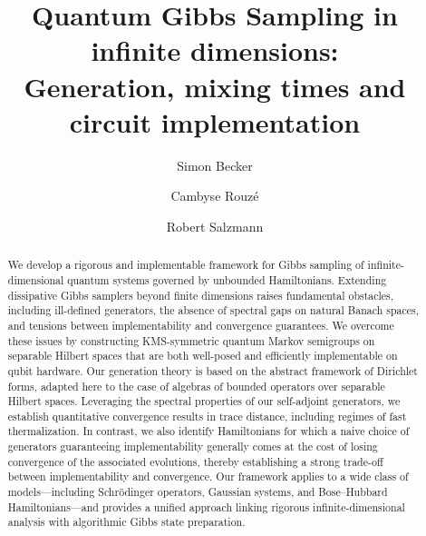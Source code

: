 \documentclass[11pt]{amsart}
\newcommand{\1}{\mathbbm{1}}
\theoremstyle{plain}
\theoremstyle{definition}
\theoremstyle{remark}
\numberwithin{equation}{section}
\begin{document}
\title[Infinite-dimensional Quantum Gibbs sampling]{Quantum Gibbs Sampling in infinite dimensions:\\
\tiny{Generation, mixing times and circuit implementation}}


\author{Simon Becker}
\address{Bocconi University, Milan, Italy}



\author{Cambyse Rouz\'e}
\address{Inria, T\'el\'ecom Paris -- LTCI,  
Institut Polytechnique de Paris,  
91120 Palaiseau, France}

\author{Robert Salzmann}
\address{RWTH Aachen, Department of Physics,  
Otto-Blumenthal-Strasse 20,  
52074 Aachen, Germany\\
Inria, ENS de Lyon, Université Claude Bernard Lyon 1, LIP, 69342, Lyon cedex 07, France}

\maketitle
\vspace{-0.3cm}

\begin{abstract}
\noindent 
We develop a rigorous and implementable framework for Gibbs sampling of infinite-dimensional quantum systems governed by unbounded Hamiltonians. Extending dissipative Gibbs samplers beyond finite dimensions raises fundamental obstacles, including ill-defined generators, the absence of spectral gaps on natural Banach spaces, and tensions between implementability and convergence guarantees.
We overcome these issues by constructing KMS-symmetric quantum Markov semigroups on separable Hilbert spaces that are both well-posed and efficiently implementable on qubit hardware. Our generation theory is based on the abstract framework of Dirichlet forms, adapted here to the case of algebras of bounded operators over separable Hilbert spaces.
Leveraging the spectral properties of our self-adjoint generators, we establish quantitative convergence results in trace distance, including regimes of fast thermalization.  In contrast, we also identify Hamiltonians for which a naive choice of generators guaranteeing implementability generally comes at the cost of losing convergence of the associated evolutions, thereby establishing a strong trade-off between implementability and convergence.
 Our framework applies to a wide class of models—including Schrödinger operators, Gaussian systems, and Bose–Hubbard Hamiltonians—and provides a unified approach linking rigorous infinite-dimensional analysis with algorithmic Gibbs state preparation.

\end{abstract}
\vspace{-0.3cm}
\tableofcontents
\end{document}
